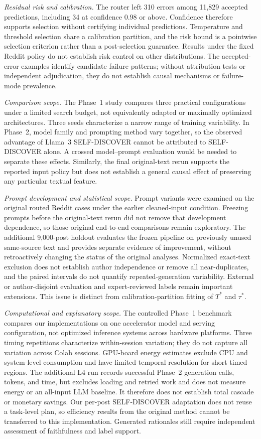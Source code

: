\documentclass{ieeeaccess}
\begin{document}
\textit{Residual risk and calibration.} The router left 310 errors among 11,829 accepted predictions, including 34 at confidence 0.98 or above. Confidence therefore supports selection without certifying individual predictions. Temperature and threshold selection share a calibration partition, and the risk bound is a pointwise selection criterion rather than a post-selection guarantee. Results under the fixed Reddit policy do not establish risk control on other distributions. The accepted-error examples identify candidate failure patterns; without attribution tests or independent adjudication, they do not establish causal mechanisms or failure-mode prevalence.

\textit{Comparison scope.} The Phase~1 study compares three practical configurations under a limited search budget, not equivalently adapted or maximally optimized architectures. Three seeds characterize a narrow range of training variability. In Phase~2, model family and prompting method vary together, so the observed advantage of Llama~3 SELF-DISCOVER cannot be attributed to SELF-DISCOVER alone. A crossed model--prompt evaluation would be needed to separate these effects. Similarly, the final original-text rerun supports the reported input policy but does not establish a general causal effect of preserving any particular textual feature.

\textit{Prompt development and statistical scope.} Prompt variants were examined on the original routed Reddit cases under the earlier cleaned-input condition. Freezing prompts before the original-text rerun did not remove that development dependence, so those original end-to-end comparisons remain exploratory. The additional 9,000-post holdout evaluates the frozen pipeline on previously unused same-source text and provides separate evidence of improvement, without retroactively changing the status of the original analyses. Normalized exact-text exclusion does not establish author independence or remove all near-duplicates, and the paired intervals do not quantify repeated-generation variability. External or author-disjoint evaluation and expert-reviewed labels remain important extensions. This issue is distinct from calibration-partition fitting of $T^*$ and $\tau^*$.

\textit{Computational and explanatory scope.} The controlled Phase~1 benchmark compares our implementations on one accelerator model and serving configuration, not optimized inference systems across hardware platforms. Three timing repetitions characterize within-session variation; they do not capture all variation across Colab sessions. GPU-board energy estimates exclude CPU and system-level consumption and have limited temporal resolution for short timed regions. The additional L4 run records successful Phase~2 generation calls, tokens, and time, but excludes loading and retried work and does not measure energy or an all-input LLM baseline. It therefore does not establish total cascade or monetary savings. Our per-post SELF-DISCOVER adaptation does not reuse a task-level plan, so efficiency results from the original method cannot be transferred to this implementation. Generated rationales still require independent assessment of faithfulness and label support.
\end{document}
